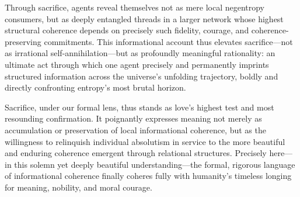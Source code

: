 Through sacrifice, agents reveal themselves not as mere local negentropy consumers, but as deeply entangled threads in a larger network whose highest structural coherence depends on precisely such fidelity, courage, and coherence-preserving commitments. This informational account thus elevates sacrifice---not as irrational self-annihilation---but as profoundly meaningful rationality: an ultimate act through which one agent precisely and permanently imprints structured information across the universe’s unfolding trajectory, boldly and directly confronting entropy’s most brutal horizon.

Sacrifice, under our formal lens, thus stands as love’s highest test and most resounding confirmation. It poignantly expresses meaning not merely as accumulation or preservation of local informational coherence, but as the willingness to relinquish individual absolutism in service to the more beautiful and enduring coherence emergent through relational structures. Precisely here---in this solemn yet deeply beautiful understanding---the formal, rigorous language of informational coherence finally coheres fully with humanity’s timeless longing for meaning, nobility, and moral courage.
